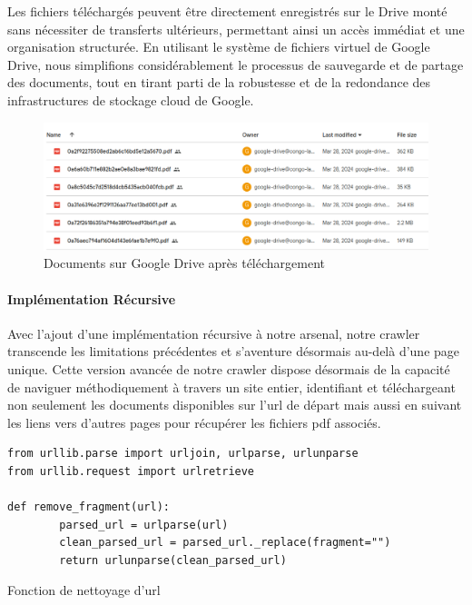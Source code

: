 Les fichiers téléchargés peuvent être directement enregistrés sur le Drive monté sans nécessiter de transferts ultérieurs, permettant ainsi un accès immédiat et une organisation structurée. En utilisant le système de fichiers virtuel de Google Drive, nous simplifions considérablement le processus de sauvegarde et de partage des documents, tout en tirant parti de la robustesse et de la redondance des infrastructures de stockage cloud de Google.

\begin{figure}[H]
    \centering
    \includegraphics[width=15cm]{gfx/fig-google-drive.png}
    \caption{Documents sur Google Drive après téléchargement}
    \label{fig:crawler-architecture}
\end{figure}

\paragraph{Implémentation Récursive} \hspace{0pt}

Avec l'ajout d'une implémentation récursive à notre arsenal, notre crawler transcende les limitations précédentes et s'aventure désormais au-delà d'une page unique. Cette version avancée de notre crawler dispose désormais de la capacité de naviguer méthodiquement à travers un site entier, identifiant et téléchargeant non seulement les documents disponibles sur l'\ac{url} de départ mais aussi en suivant les liens vers d'autres pages pour récupérer les fichiers \ac{pdf} associés.

\begin{listing}[!ht]
\begin{verbatim}
from urllib.parse import urljoin, urlparse, urlunparse
from urllib.request import urlretrieve

def remove_fragment(url):
        parsed_url = urlparse(url)
        clean_parsed_url = parsed_url._replace(fragment="")
        return urlunparse(clean_parsed_url)
\end{verbatim}
\caption{Fonction de nettoyage d'\ac{url}}
\label{appendix:code:python:remove-fragment}
\end{listing}

